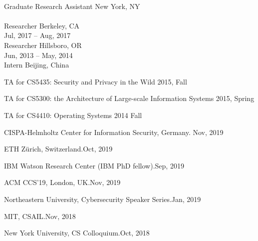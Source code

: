\vspace{-4mm}

\nocite{*}
\printbibliography[heading=none]


 \\
Graduate Research Assistant \hfill New York, NY \\[2mm]
%
 \\
Researcher \hfill Berkeley, CA\\[2mm]
%
 {Jul, 2017 -- Aug, 2017} \\
Researcher \hfill Hillsboro, OR\\[2mm]
%
 {Jun, 2013 -- May, 2014} \\
Intern \hfill Beijing, China

\begin{loneinnerlist}
\item TA for CS5435: Security and Privacy in the Wild \hfill 2015, Fall
\item TA for CS5300: the Architecture of Large-scale Information Systems \hfill 2015, Spring
\item TA for CS4410: Operating Systems \hfill 2014 Fall
\end{loneinnerlist}

\begin{innerlist}
\item CISPA-Helmholtz Center for Information Security, Germany. \hfill Nov, 2019
\item ETH Z\"urich, Switzerland.\hfill Oct, 2019
\item IBM Watson Research Center (IBM PhD fellow).\hfill Sep, 2019
\end{innerlist}

\vspace{2mm}
\begin{innerlist}
\item ACM CCS'19, London, UK.\hfill Nov, 2019
\end{innerlist}

\vspace{2mm}
\begin{innerlist}
\item Northeastern University, Cybersecurity Speaker Series.\hfill Jan, 2019
\item MIT, CSAIL.\hfill Nov, 2018
\item New York University, CS Colloquium.\hfill Oct, 2018
\end{innerlist}

